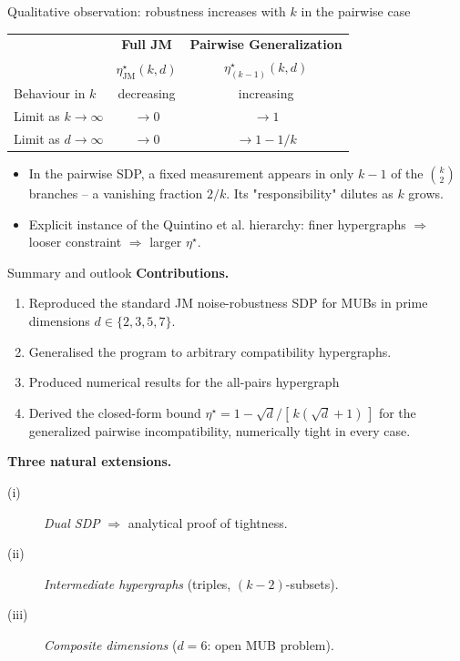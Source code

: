 \documentclass[10pt,aspectratio=169]{beamer}
\begin{document}
\begin{frame}{Qualitative observation: robustness increases with $k$ in the pairwise case}
  \centering
  \medskip
  \begin{tabular}{lcc}
    \toprule
    & \textbf{Full JM} & \textbf{Pairwise Generalization} \\
    & $\eta^{\star}_{\text{JM}}(k, d)$ & $\eta^{\star}_{(k-1)}(k, d)$ \\
    \midrule
    Behaviour in $k$  & \alert{decreasing} & \alert{increasing} \\
    Limit as $k \to \infty$ & $\to 0$ & $\to 1$ \\
    Limit as $d \to \infty$ & $\to 0$ & $\to 1 - 1/k$ \\
    \bottomrule
  \end{tabular}

  \bigskip
  \begin{itemize}
    \item In the pairwise SDP, a fixed measurement appears in only $k{-}1$ of the $\binom{k}{2}$ branches -- a vanishing fraction $2/k$. Its "responsibility" dilutes as $k$ grows.
    \item Explicit instance of the Quintino et al. hierarchy: finer hypergraphs $\Rightarrow$ looser constraint $\Rightarrow$ larger $\eta^{\star}$.
  \end{itemize}
\end{frame}

\begin{frame}{Summary and outlook}
  \textbf{Contributions.}
  \begin{enumerate}
    \item Reproduced the standard JM noise-robustness SDP for MUBs in prime dimensions $d \in \{2, 3, 5, 7\}$.
    \item Generalised the program to \alert{arbitrary compatibility hypergraphs}.
    \item Produced numerical results for the all-pairs hypergraph
    \item Derived the \alert{closed-form bound}
          $\eta^{\star} = 1 - \sqrt d / [\,k(\sqrt d + 1)\,]$
          for the generalized pairwise incompatibility, numerically tight in every case.
  \end{enumerate}

  \bigskip
  \textbf{Three natural extensions.}
  \begin{description}
    \item[(i)] \emph{Dual SDP} $\Rightarrow$ analytical proof of tightness.
    \item[(ii)] \emph{Intermediate hypergraphs} (triples, $(k\!-\!2)$-subsets).
    \item[(iii)] \emph{Composite dimensions} ($d = 6$: open MUB problem).
  \end{description}
\end{frame}
\end{document}
